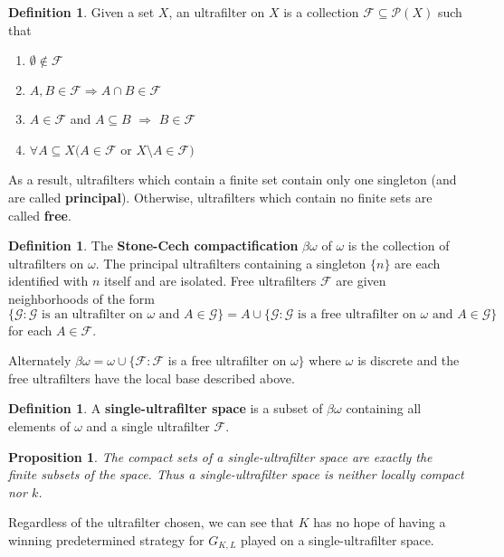 \documentclass[11pt]{article}
\theoremstyle{plain}
\newtheorem{proposition}[theorem]{Proposition}
\theoremstyle{definition}
\newtheorem{definition}[theorem]{Definition}
\theoremstyle{remark}
\begin{document}
\begin{definition}
Given a set $X$, an ultrafilter on $X$ is a collection $\mathcal{F}\subseteq\mathcal{P}(X)$ such that
    \begin{enumerate}
    \item $\emptyset\not\in \mathcal{F}$
    \item $A,B\in\mathcal{F} \Rightarrow A\cap B \in \mathcal{F}$
    \item $A\in\mathcal{F}$ and $A \subseteq B$ $\Rightarrow$ $B\in\mathcal{F}$
    \item $\forall A \subseteq X(A\in\mathcal{F}$ or $X\setminus A \in \mathcal{F})$
    \end{enumerate}
As a result, ultrafilters which contain a finite set contain only one singleton (and are called \textbf{principal}). Otherwise, ultrafilters which contain no finite sets are called \textbf{free}.
\end{definition}

\begin{definition}
The \textbf{Stone-Cech compactification} $\beta\omega$ of $\omega$ is the collection of ultrafilters on $\omega$. The principal ultrafilters containing a singleton $\{n\}$ are each identified with $n$ itself and are isolated. Free ultrafilters $\mathcal{F}$ are given neighborhoods of the form \[\{\mathcal{G} : \mathcal{G} \text{ is an ultrafilter on } \omega \text{ and } A \in \mathcal{G}\} = A \cup \{\mathcal{G}: \mathcal{G} \text{ is a free ultrafilter on } \omega \text{ and } A \in \mathcal{G}\}\] for each $A\in\mathcal{F}$.

Alternately $\beta\omega=\omega\cup\{\mathcal{F} : \mathcal{F}$ is a free ultrafilter on $\omega\}$ where $\omega$ is discrete and the free ultrafilters have the local base described above.
\end{definition}

\begin{definition}
A \textbf{single-ultrafilter space} is a subset of $\beta\omega$ containing all elements of $\omega$ and a single ultrafilter $\mathcal{F}$.
\end{definition}

\begin{proposition}
The compact sets of a single-ultrafilter space are exactly the finite subsets of the space. Thus a single-ultrafilter space is neither locally compact nor $k$.
\end{proposition}

Regardless of the ultrafilter chosen, we can see that $K$ has no hope of having a winning predetermined strategy for $G_{K,L}$ played on a single-ultrafilter space.
\end{document}
